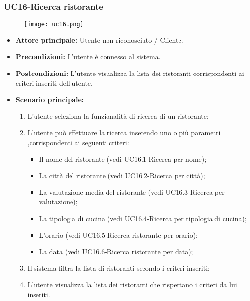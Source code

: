 \subsubsection{UC16-Ricerca ristorante}
\begin{figure}[h] \texttt{[image: uc16.png]} \end{figure}
\begin{itemize}
\item \textbf{Attore principale:} Utente non riconosciuto / Cliente.
\item \textbf{Precondizioni:} L'utente è connesso al sistema.
\item \textbf{Postcondizioni:} L'utente visualizza la lista dei ristoranti corrispondenti ai criteri inseriti
dell'utente.
\item \textbf{Scenario principale:}
\begin{enumerate}
    \item L'utente seleziona la funzionalità di ricerca di un ristorante;
    \item L'utente può effettuare la ricerca inserendo uno o più parametri ,corrispondenti
    ai seguenti criteri:
    \begin{itemize}
        \item Il nome del ristorante (vedi UC16.1-Ricerca per nome);
        \item La città del ristorante (vedi UC16.2-Ricerca per città);
        \item La valutazione media del ristorante (vedi UC16.3-Ricerca per valutazione);
        \item La tipologia di cucina (vedi UC16.4-Ricerca per tipologia di cucina);
        \item L'orario (vedi UC16.5-Ricerca ristorante per orario);
        \item La data (vedi UC16.6-Ricerca ristorante per data);
    \end{itemize}
    \item Il sistema filtra la lista di ristoranti secondo i criteri inseriti;
    \item L'utente visualizza la lista dei ristoranti che rispettano i criteri da lui inseriti.
\end{enumerate}
\end{itemize}

